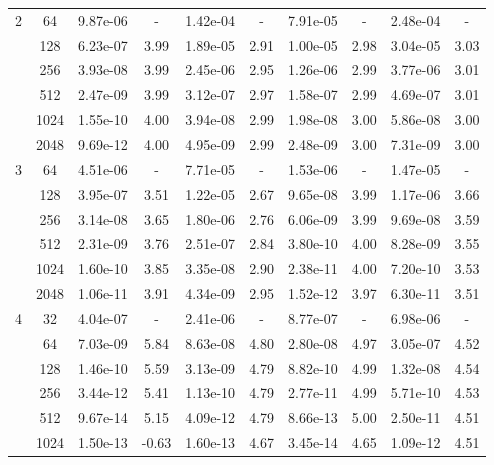 \begin{table}[htbp]
\begin{center}
\begin{tabular}{| c | c | c c | c c | c c | c c |}
			\hline

			2	& 64 & 9.87e-06 & - & 1.42e-04 & - & 7.91e-05 & - & 2.48e-04 & - \\
				& 128 & 6.23e-07 & 3.99 & 1.89e-05 & 2.91 & 1.00e-05 & 2.98 & 3.04e-05 & 3.03 \\
				& 256 & 3.93e-08 & 3.99 & 2.45e-06 & 2.95 & 1.26e-06 & 2.99 & 3.77e-06 & 3.01 \\
				& 512 & 2.47e-09 & 3.99 & 3.12e-07 & 2.97 & 1.58e-07 & 2.99 & 4.69e-07 & 3.01 \\
				& 1024 & 1.55e-10 & 4.00 & 3.94e-08 & 2.99 & 1.98e-08 & 3.00 & 5.86e-08 & 3.00 \\
				& 2048 & 9.69e-12 & 4.00 & 4.95e-09 & 2.99 & 2.48e-09 & 3.00 & 7.31e-09 & 3.00 \\

			\hline

			3	& 64 & 4.51e-06 & - & 7.71e-05 & - & 1.53e-06 & - & 1.47e-05 & - \\
				& 128 & 3.95e-07 & 3.51 & 1.22e-05 & 2.67 & 9.65e-08 & 3.99 & 1.17e-06 & 3.66 \\
				& 256 & 3.14e-08 & 3.65 & 1.80e-06 & 2.76 & 6.06e-09 & 3.99 & 9.69e-08 & 3.59 \\
				& 512 & 2.31e-09 & 3.76 & 2.51e-07 & 2.84 & 3.80e-10 & 4.00 & 8.28e-09 & 3.55 \\
				& 1024 & 1.60e-10 & 3.85 & 3.35e-08 & 2.90 & 2.38e-11 & 4.00 & 7.20e-10 & 3.53 \\
				& 2048 & 1.06e-11 & 3.91 & 4.34e-09 & 2.95 & 1.52e-12 & 3.97 & 6.30e-11 & 3.51 \\

			\hline

			4	& 32 & 4.04e-07 & - & 2.41e-06 & - & 8.77e-07 & - & 6.98e-06 & - \\
				& 64 & 7.03e-09 & 5.84 & 8.63e-08 & 4.80 & 2.80e-08 & 4.97 & 3.05e-07 & 4.52 \\
				& 128 & 1.46e-10 & 5.59 & 3.13e-09 & 4.79 & 8.82e-10 & 4.99 & 1.32e-08 & 4.54 \\
				& 256 & 3.44e-12 & 5.41 & 1.13e-10 & 4.79 & 2.77e-11 & 4.99 & 5.71e-10 & 4.53 \\
				& 512 & 9.67e-14 & 5.15 & 4.09e-12 & 4.79 & 8.66e-13 & 5.00 & 2.50e-11 & 4.51 \\
				& 1024 & 1.50e-13 & -0.63 & 1.60e-13 & 4.67 & 3.45e-14 & 4.65 & 1.09e-12 & 4.51 \\

			\hline
		\end{tabular}
	\end{center}
\end{table}

